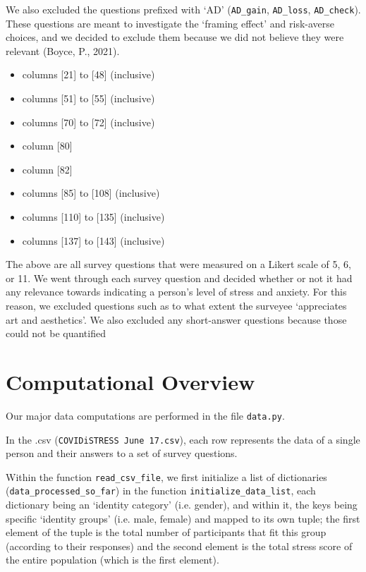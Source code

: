 \documentclass[fontsize=11pt]{article}
\begin{document}
    We also excluded the questions prefixed with ‘AD’ (\texttt{AD\_gain}, \texttt{AD\_loss}, \texttt{AD\_check}). These questions are meant to investigate the ‘framing effect’ and risk-averse choices, and we decided to exclude them because we did not believe they were relevant (Boyce, P., 2021).
    \begin{itemize}
        \item columns [21] to [48] (inclusive)
        \item columns [51] to [55] (inclusive)
        \item columns [70] to [72] (inclusive)
        \item column [80]
        \item column [82]
        \item columns [85] to [108] (inclusive)
        \item columns [110] to [135] (inclusive)
        \item columns [137] to [143] (inclusive)
    \end{itemize}

    The above are all survey questions that were measured on a Likert scale of 5, 6, or 11. We went through each survey question and decided whether or not it had any relevance towards indicating a person’s level of stress and anxiety. For this reason, we excluded questions such as to what extent the surveyee ‘appreciates art and aesthetics’. We also excluded any short-answer questions because those could not be quantified

    \section*{Computational Overview}

    Our major data computations are performed in the file \texttt{data.py}.

    In the .csv (\texttt{COVIDiSTRESS June 17.csv}), each row represents the data of a single person and their answers to a set of survey questions.

    Within the function \texttt{read\_csv\_file}, we first initialize a list of dictionaries (\texttt{data\_processed\_so\_far}) in the function \texttt{initialize\_data\_list}, each dictionary being an ‘identity category’ (i.e. gender), and within it, the keys being specific ‘identity groups’ (i.e. male, female) and mapped to its own tuple; the first element of the tuple is the total number of participants that fit this group (according to their responses) and the second element is the total stress score of the entire population (which is the first element).
\end{document}
